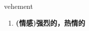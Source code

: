 
\begin{frame}
{\huge vehement}
\begin{center}
\begin{enumerate}\Large
  \item \textbf{(情感)强烈的，热情的}
\end{enumerate}
\end{center}
\end{frame}
